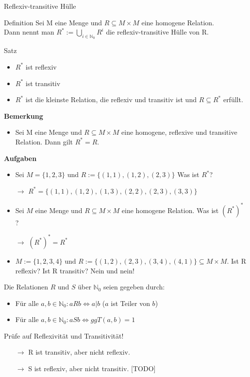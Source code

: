 \begin{frame}{Reflexiv-transitive Hülle}
	\bp\begin{block}{Definition}
		Sei M eine Menge und $R \subseteq M \times M$ eine homogene Relation. \\Dann nennt man $R^* := \bigcup\limits_{i \in \mathbb{N}_0} R^i$ die reflexiv-transitive Hülle von R.
	\end{block}
	\bp\begin{block}{Satz}
		\begin{itemize}
			\item $R^*$ ist reflexiv
			\item $R^*$ ist transitiv
			\item $R^*$ ist die kleinste Relation, die reflexiv und transitiv ist und $R \subseteq R^*$ erfüllt.
		\end{itemize}
	\end{block}
	\bp\textbf{Bemerkung}\\
	\begin{itemize}
		\item Sei M eine Menge und $R\subseteq M \times M$ eine homogene, reflexive und transitive Relation. Dann gilt $R^* = R$.
	\end{itemize}
	
\end{frame}
\begin{frame}
	\textbf{Aufgaben}\\
	\begin{itemize}
		\item Sei $M = \{1, 2, 3\}$ und $R := \{(1,1), (1,2), (2,3)\}$ Was ist $R^*$?
		\pause
		\item[$\rightarrow$] $R^* = \{(1,1), (1,2), (1,3), (2,2), (2,3), (3,3)\}$ 
		\pause
		\item Sei $M$ eine Menge und $R \subseteq M \times M$ eine homogene Relation. Was ist $(R^*)^*$ ?
		\pause
		\item[$\rightarrow$]  $(R^*)^* = R^*$
		\pause
		\item $M := \{1,2,3,4\} \text{ und } R := \{(1,2), (2,3), (3,4), (4,1)\} \subseteq M \times M$. Ist R reflexiv? Ist R transitiv? \pause \hspace{0.3cm} Nein und nein!
	\end{itemize}
\end{frame}

\begin{frame}
	Die Relationen $R$ und $S$ über $\mathbb{N}_0$ seien gegeben durch:
	\begin{itemize}
		\item Für alle $a, b \in \mathbb{N}_0: aRb \Leftrightarrow a|b$ ($a$ ist Teiler von $b$)
		\item Für alle $a, b \in \mathbb{N}_0: aSb \Leftrightarrow ggT(a,b) = 1$ 
	\end{itemize}
	Prüfe auf Reflexivität und Transitivität!
	\pause
	\begin{itemize}
		\item[$\rightarrow$] R ist transitiv, aber nicht reflexiv.
		\pause
		\item[$\rightarrow$] S ist reflexiv, aber nicht transitiv. [TODO]
	\end{itemize}
\end{frame}
